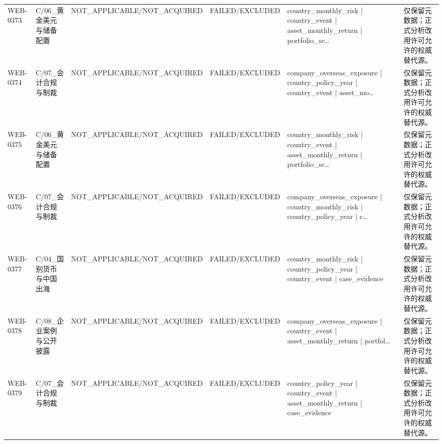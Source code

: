 \begin{landscape}
\begin{longtable}{p{1.8cm}p{2.6cm}p{2.6cm}p{2.6cm}p{4.8cm}p{7.2cm}}
WEB-0373 & C/\allowbreak{}06\_\allowbreak{}黄金美元与储备配置 & NOT\_\allowbreak{}APPLICABLE/\allowbreak{}NOT\_\allowbreak{}ACQUIRED & FAILED/\allowbreak{}EXCLUDED & country\_\allowbreak{}monthly\_\allowbreak{}risk | country\_\allowbreak{}event | asset\_\allowbreak{}monthly\_\allowbreak{}return | portfolio\_\allowbreak{}sc… & 仅保留元数据；正式分析改用许可允许的权威替代源。\\
WEB-0374 & C/\allowbreak{}07\_\allowbreak{}会计合规与制裁 & NOT\_\allowbreak{}APPLICABLE/\allowbreak{}NOT\_\allowbreak{}ACQUIRED & FAILED/\allowbreak{}EXCLUDED & company\_\allowbreak{}overseas\_\allowbreak{}exposure | country\_\allowbreak{}policy\_\allowbreak{}year | country\_\allowbreak{}event | asset\_\allowbreak{}mo… & 仅保留元数据；正式分析改用许可允许的权威替代源。\\
WEB-0375 & C/\allowbreak{}06\_\allowbreak{}黄金美元与储备配置 & NOT\_\allowbreak{}APPLICABLE/\allowbreak{}NOT\_\allowbreak{}ACQUIRED & FAILED/\allowbreak{}EXCLUDED & country\_\allowbreak{}monthly\_\allowbreak{}risk | country\_\allowbreak{}event | asset\_\allowbreak{}monthly\_\allowbreak{}return | portfolio\_\allowbreak{}sc… & 仅保留元数据；正式分析改用许可允许的权威替代源。\\
WEB-0376 & C/\allowbreak{}07\_\allowbreak{}会计合规与制裁 & NOT\_\allowbreak{}APPLICABLE/\allowbreak{}NOT\_\allowbreak{}ACQUIRED & FAILED/\allowbreak{}EXCLUDED & company\_\allowbreak{}overseas\_\allowbreak{}exposure | country\_\allowbreak{}monthly\_\allowbreak{}risk | country\_\allowbreak{}policy\_\allowbreak{}year | c… & 仅保留元数据；正式分析改用许可允许的权威替代源。\\
WEB-0377 & C/\allowbreak{}04\_\allowbreak{}国别货币与中国出海 & NOT\_\allowbreak{}APPLICABLE/\allowbreak{}NOT\_\allowbreak{}ACQUIRED & FAILED/\allowbreak{}EXCLUDED & country\_\allowbreak{}monthly\_\allowbreak{}risk | country\_\allowbreak{}policy\_\allowbreak{}year | country\_\allowbreak{}event | case\_\allowbreak{}evidence & 仅保留元数据；正式分析改用许可允许的权威替代源。\\
WEB-0378 & C/\allowbreak{}08\_\allowbreak{}企业案例与公开披露 & NOT\_\allowbreak{}APPLICABLE/\allowbreak{}NOT\_\allowbreak{}ACQUIRED & FAILED/\allowbreak{}EXCLUDED & company\_\allowbreak{}overseas\_\allowbreak{}exposure | country\_\allowbreak{}event | asset\_\allowbreak{}monthly\_\allowbreak{}return | portfol… & 仅保留元数据；正式分析改用许可允许的权威替代源。\\
WEB-0379 & C/\allowbreak{}07\_\allowbreak{}会计合规与制裁 & NOT\_\allowbreak{}APPLICABLE/\allowbreak{}NOT\_\allowbreak{}ACQUIRED & FAILED/\allowbreak{}EXCLUDED & country\_\allowbreak{}policy\_\allowbreak{}year | country\_\allowbreak{}event | asset\_\allowbreak{}monthly\_\allowbreak{}return | case\_\allowbreak{}evidence & 仅保留元数据；正式分析改用许可允许的权威替代源。\\

\end{longtable}
\end{landscape}
